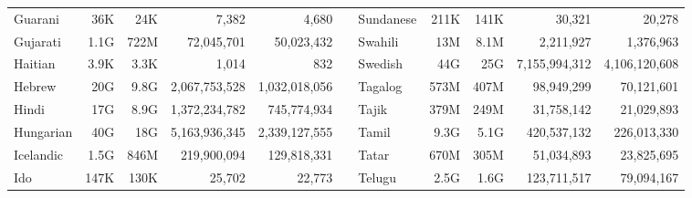 \begin{table*}[t!]
{\begin{tabular}{@{}lrrrrclrrrr@{}}
            Guarani                   & 36K                      & 24K                       & 7,382                    & 4,680                     &                          & Sundanese                 & 211K                     & 141K                      & 30,321                   & 20,278                    \\
            Gujarati                  & 1.1G                     & 722M                      & 72,045,701               & 50,023,432                &                          & Swahili                   & 13M                      & 8.1M                      & 2,211,927                & 1,376,963                 \\
            Haitian                   & 3.9K                     & 3.3K                      & 1,014                    & 832                       &                          & Swedish                   & 44G                      & 25G                       & 7,155,994,312            & 4,106,120,608             \\
            Hebrew                    & 20G                      & 9.8G                      & 2,067,753,528            & 1,032,018,056             &                          & Tagalog                   & 573M                     & 407M                      & 98,949,299               & 70,121,601                \\
            Hindi                     & 17G                      & 8.9G                      & 1,372,234,782            & 745,774,934               &                          & Tajik                     & 379M                     & 249M                      & 31,758,142               & 21,029,893                \\
            Hungarian                 & 40G                      & 18G                       & 5,163,936,345            & 2,339,127,555             &                          & Tamil                     & 9.3G                     & 5.1G                      & 420,537,132              & 226,013,330               \\
            Icelandic                 & 1.5G                     & 846M                      & 219,900,094              & 129,818,331               &                          & Tatar                     & 670M                     & 305M                      & 51,034,893               & 23,825,695                \\
            Ido                       & 147K                     & 130K                      & 25,702                   & 22,773                    &                          & Telugu                    & 2.5G                     & 1.6G                      & 123,711,517              & 79,094,167                \\

\end{tabular}}
\end{table*}

